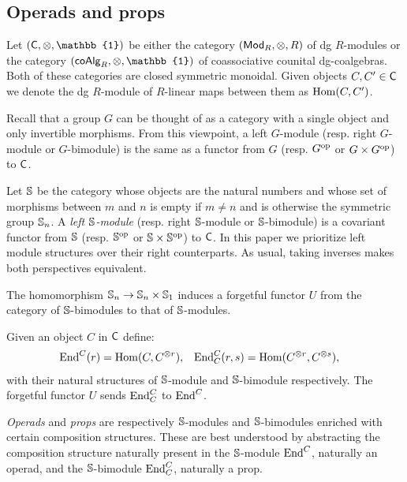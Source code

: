 
\subsection{Operads and props} \label{s:operads and props}

Let $(\C, \otimes, \mathbb{1})$ be either the category $(\Ch, \otimes, R)$ of dg $R$-modules or the category $(\coAlg_R, \otimes, \mathbb{1})$ of coassociative counital dg-coalgebras.
Both of these categories are closed symmetric monoidal.
Given objects $C, C^\prime \in \C$ we denote the dg $R$-module of $R$-linear maps between them as $\Hom(C, C^\prime)$. 

Recall that a group $G$ can be thought of as a category with a single object and only invertible morphisms. From this viewpoint, a left $G$-module (resp. right $G$-module or $G$-bimodule) is the same as a functor from $G$ (resp. $G^\op$ or $G \times G^\op$) to $\C$.

Let $\S$ be the category whose objects are the natural numbers and whose set of morphisms between $m$ and $n$ is empty if $m \neq n$ and is otherwise the symmetric group $\S_n$.
A \textit{left $\S$-module} (resp. right $\S$-module or $\S$-bimodule) is a covariant functor from $\S$ (resp. $\S^\op$ or $\S \times \S^\op$) to $\C$.
In this paper we prioritize left module structures over their right counterparts. As usual, taking inverses makes both perspectives equivalent.

The homomorphism $\S_n \to \S_n \times \S_1$ induces a forgetful functor $U$ from the category of $\S$-bimodules to that of $\S$-modules.

Given an object $C$ in $\C$ define:
\begin{align*}
\End^C(r) &= \Hom(C, C^{\otimes r}),
&\End^C_C(r, s) &= \Hom(C^{\otimes r}, C^{\otimes s}),
\end{align*}
with their natural structures of $\S$-module and $\S$-bimodule respectively.
The forgetful functor $U$ sends $\End^C_C$ to $\End^C$.

\textit{Operads} and \textit{props} are respectively $\S$-modules and \mbox{$\S$-bimodules} enriched with certain composition structures.
These are best understood by abstracting the composition structure naturally present in the $\S$-module $\End^C$, naturally an operad, and the $\S$-bimodule $\End^C_C$, naturally a prop.

